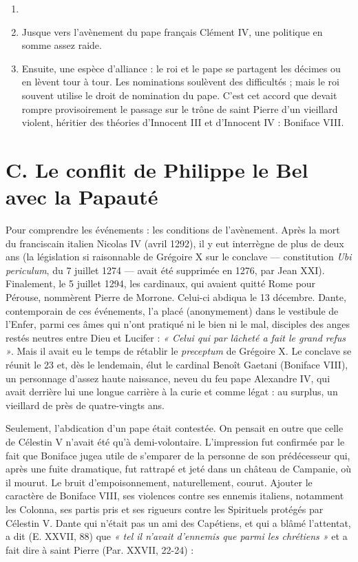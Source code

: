 \documentclass[french,twoside]{book} %
\newcommand{\labelchar}[1]{{\color{rubric}\bf #1}}
\begin{document}
\begin{enumerate}[itemsep=0pt,]
\item[] \hspace{-1.5em}{\bfseries En fait, il y a eu visiblement :}
\item Jusque vers l’avènement du pape français Clément IV, une politique en somme assez raide.
\item Ensuite, une espèce d’alliance : le roi et le pape se partagent les décimes ou en lèvent tour à tour. Les nominations soulèvent des difficultés ; mais le roi souvent utilise le droit de nomination du pape. C’est cet accord que devait rompre provisoirement le passage sur le trône de saint Pierre d’un vieillard violent, héritier des théories d’Innocent III et d’Innocent IV : Boniface VIII.

\end{enumerate}\section[C. Le conflit de Philippe le Bel avec la Papauté]{C. Le conflit de Philippe le Bel avec la Papauté \protect\footnotemark}
\label{c06c}
\noindent \labelchar{1)} Pour comprendre les événements : les conditions de l’avènement. Après la mort du franciscain italien Nicolas IV (avril 1292), il y eut interrègne de plus de deux ans (la législation si raisonnable de Grégoire X sur le conclave — constitution {\itshape Ubi periculum}, du 7 juillet 1274 — avait été supprimée en 1276, par Jean XXI).  
\label{p51} Finalement, le 5 juillet 1294, les cardinaux, qui avaient quitté Rome pour Pérouse, nommèrent Pierre de Morrone. Celui-ci abdiqua le 13 décembre. Dante, contemporain de ces événements, l’a placé (anonymement) dans le vestibule de l’Enfer, parmi ces âmes qui n’ont pratiqué ni le bien ni le mal, disciples des anges restés neutres entre Dieu et Lucifer : \emph{« Celui qui par lâcheté a fait le grand refus »}. Mais il avait eu le temps de rétablir le {\itshape preceptum} de Grégoire X. Le conclave se réunit le 23 et, dès le lendemain, élut le cardinal Benoît Gaetani (Boniface VIII), un personnage d’assez haute naissance, neveu du feu pape Alexandre IV, qui avait derrière lui une longue carrière à la curie et comme légat : au surplus, un vieillard de près de quatre-vingts ans.\par
Seulement, l’abdication d’un pape était contestée. On pensait en outre que celle de Célestin V n’avait été qu’à demi-volontaire. L’impression fut confirmée par le fait que Boniface jugea utile de s’emparer de la personne de son prédécesseur qui, après une fuite dramatique, fut rattrapé et jeté dans un château de Campanie, où il mourut. Le bruit d’empoisonnement, naturellement, courut. Ajouter le caractère de Boniface VIII, ses violences contre ses ennemis italiens, notamment les Colonna, ses partis pris et ses rigueurs contre les Spirituels protégés par Célestin V. Dante qui n’était pas un ami des Capétiens, et qui a blâmé l’attentat, a dit (E. XXVII, 88) que \emph{« tel il n’avait d’ennemis que parmi les chrétiens »} et a fait dire à saint Pierre (Par. XXVII, 22-24) :\par
\end{document}
